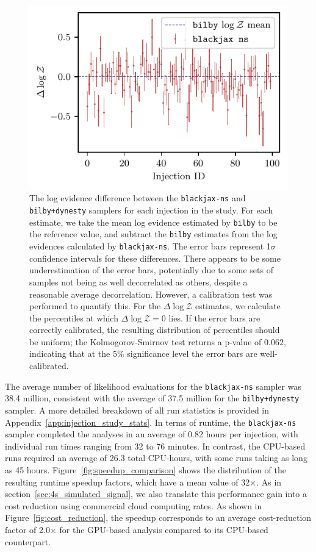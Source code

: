 \documentclass[fleqn,usenatbib]{mnras}
\begin{document}
\begin{figure}
    \centering
    \includegraphics{figures/evidence_vs_steps_iters.pdf}
    \caption{The log evidence difference between the 
    \texttt{blackjax-ns} and \texttt{bilby+dynesty} 
    samplers for each injection in the study. For each estimate,
    we take the mean log evidence estimated by \texttt{bilby} to be
    the reference value, and subtract the \texttt{bilby} estimates from the 
    log evidences calculated by \texttt{blackjax-ns}.
    The error bars represent 1$\sigma$ confidence intervals for these differences.
    There appears to be some underestimation of the error bars, potentially due
    to some sets of samples not being as well decorrelated as others, 
    despite a reasonable average decorrelation. However, a calibration test
    was performed to quantify this. For the $\Delta \log \mathcal{Z}$
    estimates, we calculate the percentiles at which $\Delta \log \mathcal{Z} = 0$
    lies. If the error bars are correctly calibrated, the resulting distribution of
    percentiles should be uniform; the Kolmogorov-Smirnov test returns a p-value of 
    $0.062$, indicating that at the $5\%$ significance level the error bars are 
    well-calibrated.}
    \label{fig:evidence_vs_steps_iters}
\end{figure}

The average number of likelihood evaluations for the \texttt{blackjax-ns}
sampler was 38.4 million, consistent with the average of 37.5 million for the
\texttt{bilby+dynesty} sampler. A more detailed breakdown of all run
statistics is provided in Appendix~\ref{app:injection_study_stats}.
In terms of runtime, the \texttt{blackjax-ns} sampler completed the analyses
in an average of 0.82 hours per injection, with individual run
times ranging from 32 to 76 minutes.
In contrast, the CPU-based runs
required an average of 26.3 total CPU-hours, with some runs taking as long as 
45 hours. 
Figure~\ref{fig:speedup_comparison} shows the distribution of the
resulting runtime speedup factors, which have a mean value of
32$\times$. As in 
section~\ref{sec:4s_simulated_signal}, we also translate this performance 
gain into a cost reduction using commercial cloud computing rates.
As shown in Figure~\ref{fig:cost_reduction}, the speedup
corresponds to an average cost-reduction factor of 2.0$\times$ for the
GPU-based analysis compared to its CPU-based counterpart.
\end{document}
